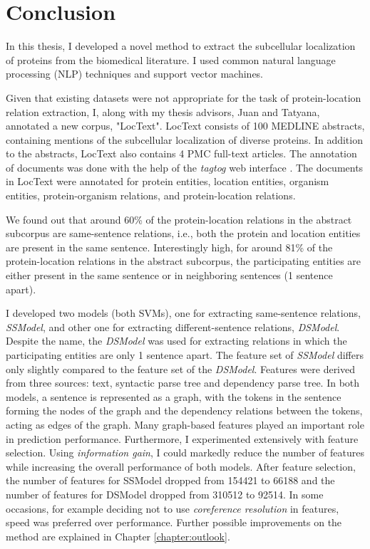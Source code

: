 \chapter{Conclusion}\label{chapter:conclusion}

In this thesis, I developed a novel method to extract the subcellular localization of proteins from the biomedical literature. I used common natural language processing (NLP) techniques and support vector machines.

Given that existing datasets were not appropriate for the task of protein-location relation extraction, I, along with my thesis advisors, Juan and Tatyana, annotated a new corpus, "LocText". LocText consists of 100 MEDLINE \cite{medline} abstracts, containing mentions of the subcellular localization of diverse proteins. In addition to the abstracts, LocText also contains 4 PMC \cite{pmc} full-text articles. The annotation of documents was done with the help of the \textit{tagtog} web interface \cite{cejuela2014tagtog}.  The documents in LocText were annotated for protein entities, location entities, organism entities, protein-organism relations, and protein-location relations.

We found out that around 60\% of the protein-location relations in the abstract subcorpus are same-sentence relations, i.e., both the protein and location entities are present in the same sentence. Interestingly high, for around 81\% of the protein-location relations in the abstract subcorpus, the participating entities are either present in the same sentence or in neighboring sentences (1 sentence apart).

I developed two models (both SVMs), one for extracting same-sentence relations, \textit{SSModel}, and other one for extracting different-sentence relations, \textit{DSModel}. Despite the name, the \textit{DSModel} was used for extracting relations in which the participating entities are only 1 sentence apart. The feature set of \textit{SSModel} differs only slightly compared to the feature set of the \textit{DSModel}. Features were derived from three sources: text, syntactic parse tree and dependency parse tree. In both models, a sentence is represented as a graph, with the tokens in the sentence forming the nodes of the graph and the dependency relations between the tokens, acting as edges of the graph. Many graph-based features played an important role in prediction performance. Furthermore, I experimented extensively with feature selection. Using \textit{information
gain}, I could markedly reduce the number of features while increasing the overall
performance of both models. After feature selection, the number of features for SSModel dropped from 154421 to 66188 and the number of features for
DSModel dropped from 310512 to 92514. In some occasions, for example deciding not to use \emph{coreference resolution} in features, speed was preferred over performance. Further possible improvements on the method are explained in Chapter \ref{chapter:outlook}.

